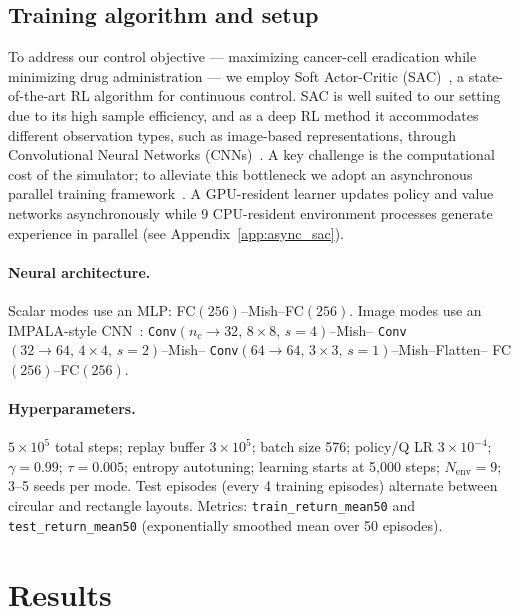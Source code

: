 \documentclass{article}
\begin{document}
\subsection{Training algorithm and setup}
\label{sec:training}

To address our control objective — maximizing cancer-cell eradication while
minimizing drug administration — we employ Soft Actor-Critic
(SAC)~\citep{haarnoja2018soft}, a state-of-the-art RL algorithm for continuous
control. SAC is well suited to our setting due to its high sample efficiency,
and as a deep RL method it accommodates different observation types, such as
image-based representations, through Convolutional Neural Networks
(CNNs)~\citep{o2015introduction}. A key challenge is the computational cost of
the simulator; to alleviate this bottleneck we adopt an asynchronous parallel
training framework~\citep{mnih2016asynchronous, liu2025asynchronous}.
A GPU-resident learner updates policy and value networks asynchronously while
9 CPU-resident environment processes generate experience in parallel (see
Appendix~\ref{app:async_sac}).

\paragraph{Neural architecture.}
Scalar modes use an MLP: FC$(256)$--Mish--FC$(256)$.
Image modes use an IMPALA-style CNN~\citep{espeholt2018impala}:
\texttt{Conv}$(n_c\!\to\!32,\,8{\times}8,\,s{=}4)$--Mish--%
\texttt{Conv}$(32\!\to\!64,\,4{\times}4,\,s{=}2)$--Mish--%
\texttt{Conv}$(64\!\to\!64,\,3{\times}3,\,s{=}1)$--Mish--Flatten--%
FC$(256)$--FC$(256)$.

\paragraph{Hyperparameters.}
$5\!\times\!10^5$ total steps; replay buffer $3\!\times\!10^5$;
batch size 576; policy/Q LR $3\!\times\!10^{-4}$; $\gamma=0.99$;
$\tau=0.005$; entropy autotuning; learning starts at 5{,}000 steps;
$N_\text{env}=9$; 3--5 seeds per mode.
Test episodes (every 4 training episodes) alternate between circular and
rectangle layouts.
Metrics: \texttt{train\_return\_mean50} and \texttt{test\_return\_mean50}
(exponentially smoothed mean over 50 episodes).

\section{Results}
\label{sec:results}
\end{document}

